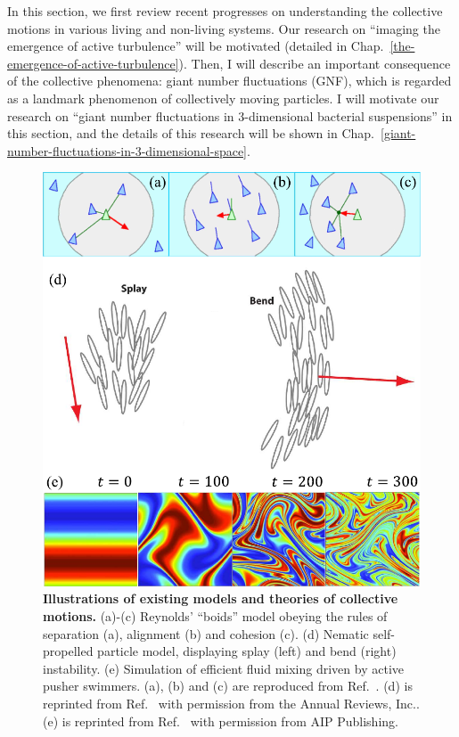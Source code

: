 In this section, we first review recent progresses on understanding the collective motions in various living and non-living systems. Our research on ``imaging the emergence of active turbulence'' will be motivated
(detailed in Chap.~\ref{the-emergence-of-active-turbulence}). Then, I will describe an important consequence of the collective phenomena: giant number fluctuations (GNF), which is regarded as a landmark phenomenon of collectively moving particles. I will motivate our research on ``giant number fluctuations in 3-dimensional bacterial suspensions'' in this section, and the details of this research will be shown in Chap.~\ref{giant-number-fluctuations-in-3-dimensional-space}.

\begin{figure}[!htbp]
	\begin{center}
	\includegraphics[width=5.5 in]{Figs/1-Intro/4.pdf}
	\end{center}
	\caption[Illustrations of existing models and theories of collective motions]
	{
	\textbf{Illustrations of existing models and theories of collective motions.}
	(a)-(c) Reynolds’ “boids” model obeying the rules of separation (a), alignment (b) and cohesion (c).
	(d) Nematic self-propelled particle model, displaying splay (left) and bend (right) instability.
	(e) Simulation of efficient fluid mixing driven by active pusher swimmers.
	(a), (b) and (c) are reproduced from Ref.~\cite{Reynolds1987}.
	(d) is reprinted from Ref.~\cite{Ramaswamy2010} with permission from the Annual Reviews, Inc..
	(e) is reprinted from Ref.~\cite{Saintillan2008b} with permission from AIP Publishing.
	}
	\label{fig:models-of-collective-motions}
\end{figure}

